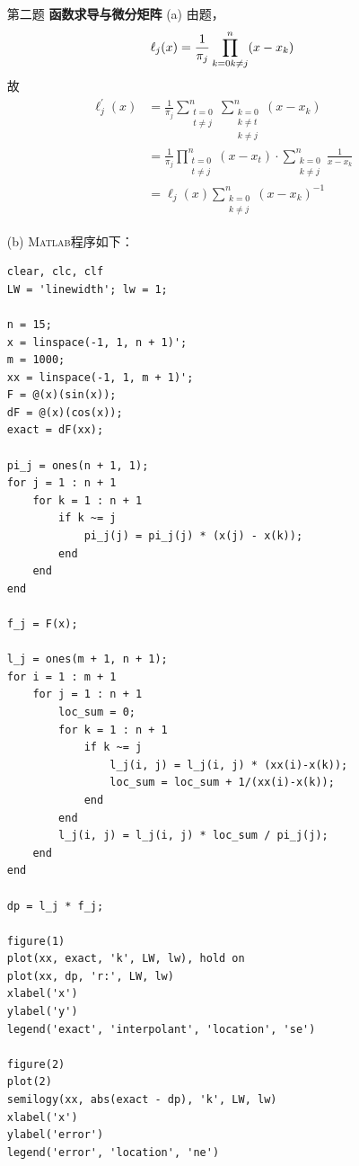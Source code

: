 \documentclass[12pt,a4paper,utf8]{ctexart}
\begin{document}
\begin{enumerate}
\item[第二题] \textbf{函数求导与微分矩阵} 
\subitem(a)
由题，
\begin{equation}
    \ell_j(x) = \frac{1}{\pi_j} \prod_{k=0\\k \neq j}^{n}(x-x_k)
\end{equation}
故
\begin{equation}
    \begin{aligned}
        \ell_j^{'}(x) &= \frac{1}{\pi_j} \sum_{\substack{t=0\\t \neq j}}^{n} \sum_{\substack{k=0\\k \neq t\\k \neq j}}^{n} (x-x_k)\\
        &= \frac{1}{\pi_j} \prod_{\substack{t=0\\t \neq j}}^{n} (x-x_t) \cdot \sum_{\substack{k=0\\k \neq j}}^{n} \frac{1}{x-x_k}\\
        &= \ell_j(x) \sum_{\substack{k=0\\k \neq j}}^{n} (x-x_k)^{-1}
    \end{aligned}
\end{equation}

\subitem(b)
\textsc{Matlab}程序如下：
\begin{lstlisting}[frame=single]
clear, clc, clf
LW = 'linewidth'; lw = 1;

n = 15;
x = linspace(-1, 1, n + 1)';
m = 1000;
xx = linspace(-1, 1, m + 1)';
F = @(x)(sin(x));
dF = @(x)(cos(x));
exact = dF(xx);

pi_j = ones(n + 1, 1);
for j = 1 : n + 1
    for k = 1 : n + 1
        if k ~= j
            pi_j(j) = pi_j(j) * (x(j) - x(k));
        end
    end
end

f_j = F(x);

l_j = ones(m + 1, n + 1);
for i = 1 : m + 1
    for j = 1 : n + 1
        loc_sum = 0;
        for k = 1 : n + 1
            if k ~= j
                l_j(i, j) = l_j(i, j) * (xx(i)-x(k));
                loc_sum = loc_sum + 1/(xx(i)-x(k));
            end
        end
        l_j(i, j) = l_j(i, j) * loc_sum / pi_j(j);
    end
end

dp = l_j * f_j;

figure(1)
plot(xx, exact, 'k', LW, lw), hold on
plot(xx, dp, 'r:', LW, lw)
xlabel('x')
ylabel('y')
legend('exact', 'interpolant', 'location', 'se')

figure(2)
plot(2)
semilogy(xx, abs(exact - dp), 'k', LW, lw)
xlabel('x')
ylabel('error')
legend('error', 'location', 'ne')
\end{lstlisting}


\end{enumerate}
\end{document}

